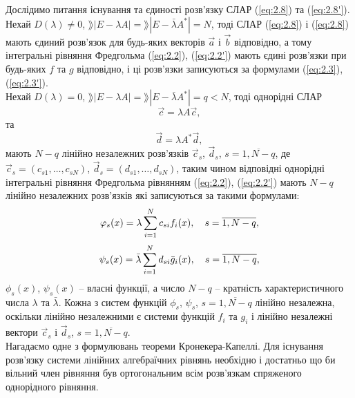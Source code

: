 Дослідимо питання існування та єдиності розв'язку СЛАР (\ref{eq:2.8}) та (\ref{eq:2.8'}). \\

Нехай $D(\lambda) \ne 0$, $\rang |E - \lambda A| = \rang |E - \bar \lambda A^*| = N$, тоді СЛАР (\ref{eq:2.8}) і (\ref{eq:2.8}) мають єдиний розв’язок для будь-яких векторів $\vec a$ і $\vec b$ відповідно, а тому інтегральні рівняння Фредгольма (\ref{eq:2.2}), (\ref{eq:2.2'}) мають єдині розв’язки при будь-яких $f$ та $g$ відповідно, і ці розв’язки записуються за формулами (\ref{eq:2.3}), (\ref{eq:2.3'}). \\

Нехай $D(\lambda) = 0$, $\rang |E - \lambda A| = \rang |E - \bar \lambda A^*| = q < N$, тоді однорідні СЛАР 
\begin{equation}
	\label{eq:2.9}
	\vec c = \lambda A \vec c,
\end{equation}
та
\begin{equation}
	\label{eq:2.9'}
	\vec d = \lambda A^* \vec d,
\end{equation}
мають $N - q$ лінійно незалежних розв’язків $\vec c_s$, $\vec d_s$, $s = \overline{1, N - q}$, де $\vec c_s = (c_{s1}, \ldots, c_{sN})$, $\vec d_s = (d_{s1}, \ldots, d_{sN})$, таким чином відповідні однорідні інтегральні рівняння Фредгольма рівнянням (\ref{eq:2.2}), (\ref{eq:2.2'}) мають $N - q$ лінійно незалежних розв’язків які записуються за такими формулами:
\begin{equation}
	\label{eq:2.10}
	\varphi_s(x) = \lambda \displaystyle\sum\limits_{i = 1}^N c_{si} f_i(x), \quad s = \overline{1, N - q},
\end{equation}
\begin{equation}
	\label{eq:2.10'}
	\psi_s(x) = \bar \lambda \displaystyle\sum\limits_{i = 1}^N d_{si} \bar g_i(x), \quad s = \overline{1, N - q},
\end{equation}
$\phi_s(x)$, $\psi_s(x)$ -- власні функції, а число $N - q$ -- кратність характеристичного числа $\lambda$ та $\bar \lambda$. Кожна з систем функцій $\phi_s$, $\psi_s$, $s = \overline{1, N - q}$ лінійно незалежна, оскільки лінійно незалежними є системи функцій $f_i$ та $g_i$ і лінійно незалежні вектори $\vec c_s$ і $\vec d_s$, $s = \overline{1, N - q}$. \\

Нагадаємо одне з формулювань теореми Кронекера-Капеллі. Для існування розв’язку системи лінійних алгебраїчних рівнянь необхідно і достатньо що би вільний член рівняння був ортогональним всім розв’язкам спряженого однорідного рівняння. \\

